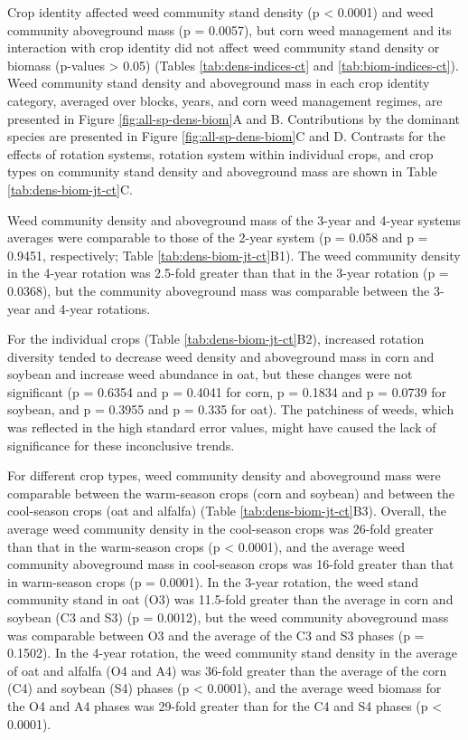 \documentclass[
]{article}
\begin{document}
Crop identity affected weed community stand density (p \textless{} 0.0001) and weed community aboveground mass (p = 0.0057), but corn weed management and its interaction with crop identity did not affect weed community stand density or biomass (p-values \textgreater{} 0.05) (Tables \ref{tab:dens-indices-ct} and \ref{tab:biom-indices-ct}). Weed community stand density and aboveground mass in each crop identity category, averaged over blocks, years, and corn weed management regimes, are presented in Figure \ref{fig:all-sp-dens-biom}A and B. Contributions by the dominant species are presented in Figure \ref{fig:all-sp-dens-biom}C and D. Contrasts for the effects of rotation systems, rotation system within individual crops, and crop types on community stand density and aboveground mass are shown in Table \ref{tab:dens-biom-jt-ct}C.

Weed community density and aboveground mass of the 3-year and 4-year systems averages were comparable to those of the 2-year system (p = 0.058 and p = 0.9451, respectively; Table \ref{tab:dens-biom-jt-ct}B1). The weed community density in the 4-year rotation was 2.5-fold greater than that in the 3-year rotation (p = 0.0368), but the community aboveground mass was comparable between the 3-year and 4-year rotations.

For the individual crops (Table \ref{tab:dens-biom-jt-ct}B2), increased rotation diversity tended to decrease weed density and aboveground mass in corn and soybean and increase weed abundance in oat, but these changes were not significant (p = 0.6354 and p = 0.4041 for corn, p = 0.1834 and p = 0.0739 for soybean, and p = 0.3955 and p = 0.335 for oat). The patchiness of weeds, which was reflected in the high standard error values, might have caused the lack of significance for these inconclusive trends.

For different crop types, weed community density and aboveground mass were comparable between the warm-season crops (corn and soybean) and between the cool-season crops (oat and alfalfa) (Table \ref{tab:dens-biom-jt-ct}B3). Overall, the average weed community density in the cool-season crops was 26-fold greater than that in the warm-season crops (p \textless{} 0.0001), and the average weed community aboveground mass in cool-season crops was 16-fold greater than that in warm-season crops (p = 0.0001). In the 3-year rotation, the weed stand community stand in oat (O3) was 11.5-fold greater than the average in corn and soybean (C3 and S3) (p = 0.0012), but the weed community aboveground mass was comparable between O3 and the average of the C3 and S3 phases (p = 0.1502). In the 4-year rotation, the weed community stand density in the average of oat and alfalfa (O4 and A4) was 36-fold greater than the average of the corn (C4) and soybean (S4) phases (p \textless{} 0.0001), and the average weed biomass for the O4 and A4 phases was 29-fold greater than for the C4 and S4 phases (p \textless{} 0.0001).
\end{document}
